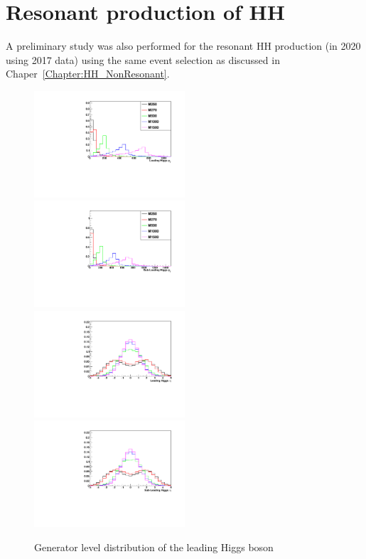 \chapter{Resonant production of HH}
A preliminary study was also performed for the resonant HH production (in 2020 using 2017 data) using the same event selection as discussed in Chaper~\ref{Chapter:HH_NonResonant}.

\begin{figure}[htb]
  \centering
  \includegraphics[width=0.5\textwidth]{Images/ResonantHH/gen_leading_Higgs_Pt.pdf}%
  \includegraphics[width=0.5\textwidth]{Images/ResonantHH/gen_Subleading_Higgs_Pt.pdf}\\
  \includegraphics[width=0.5\textwidth]{Images/ResonantHH/gen_leading_Higgs_Eta.pdf}%
  \includegraphics[width=0.5\textwidth]{Images/ResonantHH/gen_Subleading_Higgs_Eta.pdf}
\caption{Generator level distribution of the leading Higgs boson} \label{fig:diagram}
\end{figure}

